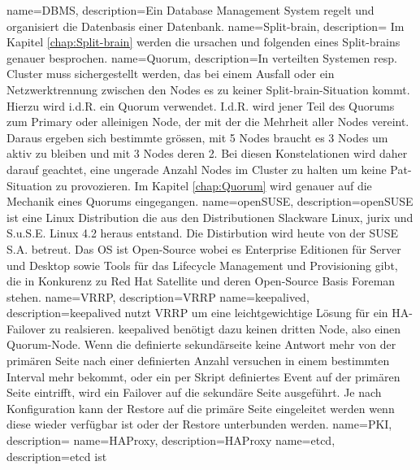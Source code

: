 {
        name=DBMS,
        description={Ein Database Management System regelt und organisiert die Datenbasis einer Datenbank\cite{8XWD67EM}.}
}
{
        name=Split-brain,
        description={
%        
        Im Kapitel \autoref{chap:Split-brain} werden die ursachen und folgenden eines Split-brains genauer besprochen.
        }
}
{
        name=Quorum,
        description={In verteilten Systemen resp. Cluster muss sichergestellt werden, das bei einem Ausfall oder ein Netzwerktrennung zwischen den Nodes es zu keiner \Gls{Split-brain}-Situation kommt.
        Hierzu wird i.d.R. ein Quorum verwendet.
        I.d.R. wird jener Teil des Quorums zum Primary oder alleinigen Node, der mit der die Mehrheit aller Nodes vereint. Daraus ergeben sich bestimmte grössen, mit 5 Nodes braucht es 3 Nodes um aktiv zu bleiben und mit 3 Nodes deren 2.
        Bei diesen Konstelationen wird daher darauf geachtet, eine ungerade Anzahl Nodes im Cluster zu halten um keine Pat-Situation zu provozieren.
%        
        Im Kapitel \autoref{chap:Quorum} wird genauer auf die Mechanik eines Quorums eingegangen.
        }
}
{
        name=openSUSE,
        description={openSUSE ist eine Linux Distribution die aus den Distributionen Slackware Linux, jurix und S.u.S.E. Linux 4.2 heraus entstand.
        Die Distirbution wird heute von der SUSE S.A. betreut.
        Das OS ist Open-Source wobei es Enterprise Editionen für Server und Desktop sowie Tools für das Lifecycle Management und Provisioning gibt,
        die in Konkurenz zu Red Hat Satellite und deren Open-Source Basis \Gls{Foreman} stehen.}
}
{
        name=VRRP,
        description={VRRP }
}
{
        name=keepalived,
        description={keepalived nutzt \Gls{VRRP} um eine leichtgewichtige Lösung für ein HA-\Gls{Failover} zu realsieren.
        keepalived benötigt dazu keinen dritten Node, also einen \Gls{Quorum}-Node.
        Wenn die definierte sekundärseite keine Antwort mehr von der primären Seite nach einer definierten Anzahl versuchen in einem bestimmten Interval mehr bekommt,
        oder ein per Skript definiertes Event auf der primären Seite eintrifft, wird ein \Gls{Failover} auf die sekundäre Seite ausgeführt.
        Je nach Konfiguration kann der Restore auf die primäre Seite eingeleitet werden wenn diese wieder verfügbar ist oder der Restore unterbunden werden\cite{5IP362SV,ZW4PA3EQ}.}
}
{
        name=PKI,
        description={}
}
{
        name=HAProxy,
        description={HAProxy \cite{U6F2DWTQ}}
}
{
        name=etcd,
        description={etcd ist \cite{8A4R4E2D}}
}